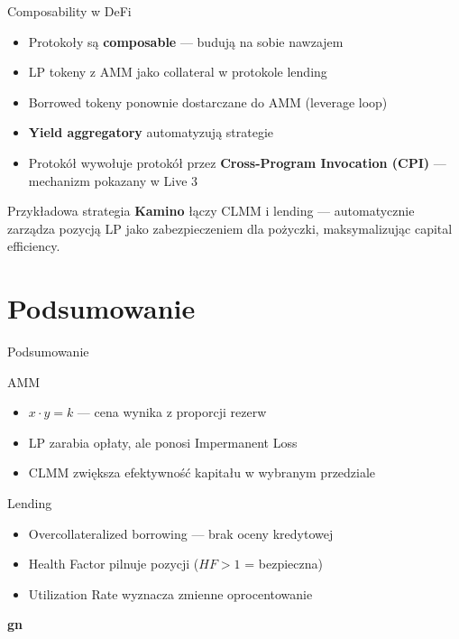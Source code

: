 \begin{frame}{Composability w DeFi}
  \begin{itemize}
    \item Protokoły są \textbf{composable} --- budują na sobie nawzajem
    \item LP tokeny z AMM jako collateral w protokole lending
    \item Borrowed tokeny ponownie dostarczane do AMM (leverage loop)
    \item \textbf{Yield aggregatory} automatyzują strategie
    \item Protokół wywołuje protokół przez \textbf{Cross-Program Invocation (CPI)} --- mechanizm pokazany w Live 3
  \end{itemize}
  \vspace{0.3cm}
  \begin{exampleblock}{Przykładowa strategia}
    \textbf{Kamino} łączy CLMM i lending --- automatycznie zarządza pozycją
    LP jako zabezpieczeniem dla pożyczki, maksymalizując capital efficiency.
  \end{exampleblock}
\end{frame}

\section{Podsumowanie}

\begin{frame}{Podsumowanie}
  \begin{block}{AMM}
    \begin{itemize}
      \item $x \cdot y = k$ --- cena wynika z proporcji rezerw
      \item LP zarabia opłaty, ale ponosi Impermanent Loss
      \item CLMM zwiększa efektywność kapitału w wybranym przedziale
    \end{itemize}
  \end{block}
  \begin{block}{Lending}
    \begin{itemize}
      \item Overcollateralized borrowing --- brak oceny kredytowej
      \item Health Factor pilnuje pozycji ($HF > 1$ = bezpieczna)
      \item Utilization Rate wyznacza zmienne oprocentowanie
    \end{itemize}
  \end{block}
\end{frame}

\begin{frame}[plain]
  \begin{center}
    \vfill
    {\Huge\bfseries\color{stplwhite} gn}
    \vfill
  \end{center}
\end{frame}



